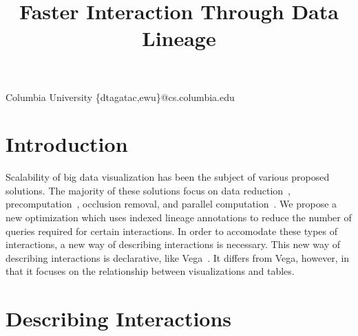 \documentclass[fleqn,reprint]{sigplanconf}
\begin{document}
\setlength{\pdfpageheight}{\paperheight}
\setlength{\pdfpagewidth}{\paperwidth}


\title{Faster Interaction Through Data Lineage}

           {Columbia University}
           {\{dtagatac,ewu\}@cs.columbia.edu}

\maketitle



\section{Introduction}
Scalability of big data visualization has been the subject of various proposed solutions.
The majority of these solutions focus on data reduction~\cite{Liu2013}, precomputation~\cite{Liu2013}, occlusion removal, and parallel computation~\cite{Liu2013}.
We propose a new optimization which uses indexed lineage annotations to reduce the number of queries required for certain interactions.
In order to accomodate these types of interactions, a new way of describing interactions is necessary.
This new way of describing interactions is declarative, like Vega~\cite{Satyanarayan}.
It differs from Vega, however, in that it focuses on the relationship between visualizations and tables.

\section{Describing Interactions}
\end{document}

